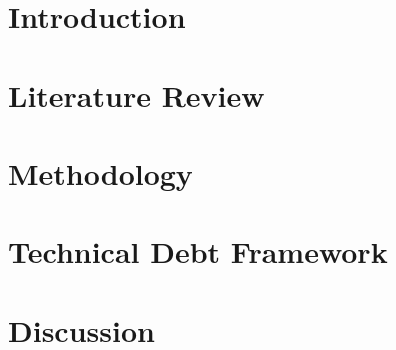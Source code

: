 \documentclass[
  letterpaper,
  11pt,
  english,
  singlespacing,
  headsepline]{MastersDoctoralThesis}
\begin{document}




\dedicatory{} 



\mainmatter %

\pagestyle{thesis} %
\newcommand{\keyword}[1]{\textbf{#1}}
\newcommand{\tabhead}[1]{\textbf{#1}}
\newcommand{\code}[1]{\texttt{#1}}
\newcommand{\file}[1]{\texttt{\bfseries#1}}
\newcommand{\option}[1]{\texttt{\itshape#1}}



\chapter{Introduction}\label{introduction}


\chapter{Literature Review}\label{literature-review}


\chapter{Methodology}\label{methodology}


\chapter{Technical Debt Framework}\label{technical-debt-framework}


\chapter{Discussion}\label{discussion}
\end{document}
